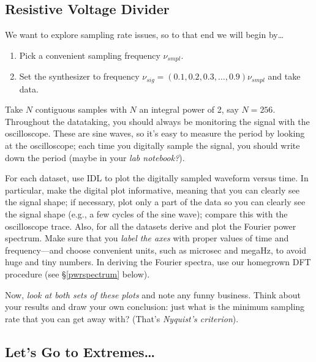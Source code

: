 \documentclass[11pt,preprint]{aastex}
\begin{document}
\subsection{Resistive Voltage Divider}

	We want to explore sampling rate issues, so to that end
we will begin by\dots \begin{enumerate}

	\item Pick a convenient sampling frequency $\nu_{smpl}$.  

	\item Set the synthesizer to frequency $\nu_{sig} = (0.1, 0.2,
	  0.3, \dots, 0.9) \nu_{smpl}$ and take data. 

\end{enumerate}

\noindent Take $N$ contiguous samples with $N$ an integral power of 2, say
$N=256$.  Throughout the datataking, you should always be
monitoring the signal with the oscilloscope. These are sine waves, so
it's easy to measure the period by looking at the oscilloscope; each
time you digitally sample the signal, you should write down the period
(maybe in your {\it lab notebook?}).  

For each dataset, use IDL to plot the digitally sampled waveform versus
time.  In particular, make the digital plot informative, meaning that
you can clearly see the signal shape; if necessary, plot only a part of
the data so you can clearly see the signal shape (e.g., a few cycles of
the sine wave); compare this with the oscilloscope trace.  Also, for all
the datasets derive and plot the Fourier power spectrum.  Make sure that
you {\it label the axes} with proper values of time and frequency---and
choose convenient units, such as microsec and megaHz, to avoid huge and
tiny numbers.  In deriving the Fourier spectra, use our homegrown DFT
procedure (see \S \ref{pwrspectrum} below).

Now, {\it look at both sets of these plots} and note any funny business.
Think about your results and draw your own conclusion: just what is the
minimum sampling rate that you can get away with? (That's {\it Nyquist's
  criterion}). 

\subsection{Let's Go to Extremes\dots}
\end{document}
